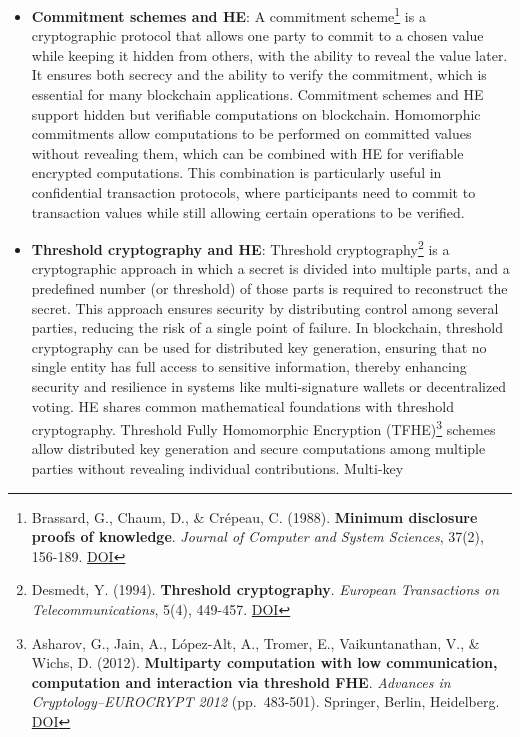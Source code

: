 \documentclass[
  letterpaper,
  DIV=11,
  numbers=noendperiod,
  oneside]{scrartcl}
\begin{document}
\begin{itemize}
\item
  \textbf{Commitment schemes and HE}: A commitment scheme\footnote{Brassard,
    G., Chaum, D., \& Crépeau, C. (1988). \textbf{Minimum disclosure
    proofs of knowledge}. \emph{Journal of Computer and System
    Sciences}, 37(2), 156-189.
    \href{https://doi.org/10.1016/0022-0000(88)90005-0}{DOI}} is a
  cryptographic protocol that allows one party to commit to a chosen
  value while keeping it hidden from others, with the ability to reveal
  the value later. It ensures both secrecy and the ability to verify the
  commitment, which is essential for many blockchain applications.
  Commitment schemes and HE support hidden but verifiable computations
  on blockchain. Homomorphic commitments allow computations to be
  performed on committed values without revealing them, which can be
  combined with HE for verifiable encrypted computations. This
  combination is particularly useful in confidential transaction
  protocols, where participants need to commit to transaction values
  while still allowing certain operations to be verified.
\item
  \textbf{Threshold cryptography and HE}: Threshold
  cryptography\footnote{Desmedt, Y. (1994). \textbf{Threshold
    cryptography}. \emph{European Transactions on Telecommunications},
    5(4), 449-457. \href{https://doi.org/10.1002/ett.4460050407}{DOI}}
  is a cryptographic approach in which a secret is divided into multiple
  parts, and a predefined number (or threshold) of those parts is
  required to reconstruct the secret. This approach ensures security by
  distributing control among several parties, reducing the risk of a
  single point of failure. In blockchain, threshold cryptography can be
  used for distributed key generation, ensuring that no single entity
  has full access to sensitive information, thereby enhancing security
  and resilience in systems like multi-signature wallets or
  decentralized voting. HE shares common mathematical foundations with
  threshold cryptography. Threshold Fully Homomorphic Encryption
  (TFHE)\footnote{Asharov, G., Jain, A., López-Alt, A., Tromer, E.,
    Vaikuntanathan, V., \& Wichs, D. (2012). \textbf{Multiparty
    computation with low communication, computation and interaction via
    threshold FHE}. \emph{Advances in Cryptology--EUROCRYPT 2012}
    (pp.~483-501). Springer, Berlin, Heidelberg.
    \href{https://doi.org/10.1007/978-3-642-29011-4_29}{DOI}} schemes
  allow distributed key generation and secure computations among
  multiple parties without revealing individual contributions. Multi-key

\end{itemize}
\end{document}
